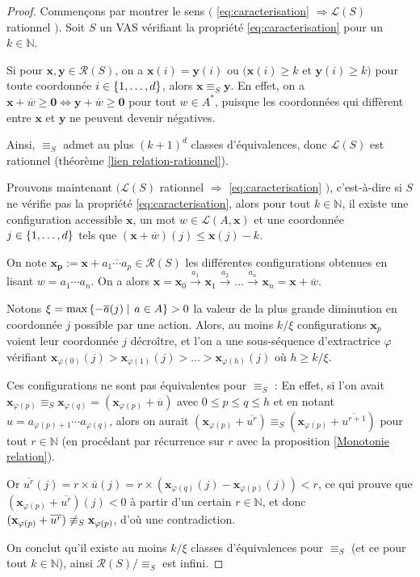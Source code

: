 \documentclass[a4paper,final]{article}
\theoremstyle{definition}
\let\phi\varphi
\let\leq\leqslant
\let\geq\geqslant
\newcommand{\set}[2]{\left\{#1\mathrel{\left|\vphantom{#1}\vphantom{#2}\right.}#2\right\}}
\newcommand{\os}[1]{\left\{\mathinner{#1}\right\}}
\newcommand{\N}{\ensuremath{\mathbb{N}}}
\newcommand{\lang}{\ensuremath{\mathcal{L}}}
\newcommand{\conf}{\ensuremath{\mathcal{R}}}
\newcommand{\trans}[2]{\ensuremath{\stackrel{#1}{\longrightarrow}_{#2}}}
\newcommand{\vect}[1]{\ensuremath{\mathbf{#1}}}
\newcommand{\rel}{\ensuremath{\equiv}}
\newcommand{\equivaut}{\ensuremath{\Leftrightarrow}}
\newcommand{\valeur}[1]{\ensuremath{\overline{#1}}}
\begin{document}
\begin{proof}
Commençons par montrer le sens $\big($ \eqref{eq:caracterisation} $\Rightarrow \lang(S)$ rationnel $\big)$.
Soit $S$ un VAS vérifiant la propriété \eqref{eq:caracterisation} pour un $k\in\N$.

Si pour $\vect{x},\vect{y}\in\conf(S)$, on a 
$\vect{x}(i)=\vect{y}(i)$ ou $\big( \vect{x}(i)\geq k \text{ et } \vect{y}(i)\geq k \big)$
pour toute coordonnée $i\in\os{1,\dots,d}$, alors $\vect{x}\rel_S \vect{y}$. 
En effet, on a $\vect{x} +\valeur{w} \geq\vect{0} \equivaut \vect{y} +\valeur{w} \geq\vect{0}$ pour tout $w\in A^\ast$, 
puisque les coordonnées qui diffèrent entre $\vect{x}$ et $\vect{y}$ ne peuvent devenir négatives.

Ainsi, $\rel_S$ admet au plus $(k+1)^d$ classes d'équivalences, donc $\lang(S)$ est rationnel (théorème \ref{lien relation-rationnel}).

\vspace{4mm}\noindent
Prouvons maintenant $\big(\lang(S)$ rationnel $\Rightarrow$ \eqref{eq:caracterisation} $\big)$, c'est-à-dire si $S$ ne vérifie pas la propriété \eqref{eq:caracterisation}, alors
pour tout $k\in\N$, il existe une configuration accessible $\vect{x}$, un mot $w\in \lang(A,\vect{x})$ et une coordonnée $j\in\os{1,\dots,d}$ tels que $(\vect{x} +\valeur{w})(j)\leq \vect{x}(j)-k$.

On note $\vect{x_p}:=\vect{x} +\valeur{a_1\cdots a_p} \in\conf(S)$ les différentes configurations obtenues en lisant $w=a_1\cdots a_n$.
On a alors $\vect{x}=\vect{x}_0 \trans{a_1}{}\vect{x}_1 \trans{a_2}{}\dots \trans{a_n}{}\vect{x}_n= \vect{x} +\valeur{w}$.

Notons $\xi = \text{max}\set{-\valeur{a}(j)} {a\in A} >0$ la valeur de la plus grande diminution en coordonnée $j$ possible par une action.
Alors, au moins $k/\xi$ configurations $\vect{x}_p$ voient leur coordonnée $j$ décroître,
et l'on a une sous-séquence d'extractrice $\phi$ vérifiant $\vect{x}_{\phi(0)}(j)>\vect{x}_{\phi(1)}(j)>\dots>\vect{x}_{\phi(h)}(j)$ où $h\geq k/\xi$.


Ces configurations ne sont pas équivalentes pour $\rel_S$ :
En effet, si l'on avait $\vect{x}_{\phi(p)}\rel_S \vect{x}_{\phi(q)} = (\vect{x}_{\phi(p)} +\valeur{u})$ avec $0\leq p\leq q\leq h$ et en notant $u=a_{\phi(p)+1}\cdots a_{\phi(q)}$, 
alors on aurait $(\vect{x}_{\phi(p)} +\valeur{u^r}) \rel_S (\vect{x}_{\phi(p)} +\valeur{u^{r+1}})$ pour tout $r\in\N$ (en procédant par récurrence sur $r$ avec la proposition \ref{Monotonie relation}).

Or $\valeur{u^r}(j) = r\times\valeur{u}(j) = r\times (\vect{x}_{\phi(q)}(j) -\vect{x}_{\phi(p)}(j)) <r$, 
ce qui prouve que $(\vect{x}_{\phi(p)} +\valeur{u^r})(j)<0$ à partir d'un certain $r\in\N$, 
et donc $(\vect{x}_{\phi(p)} +\valeur{u^r}) \not\rel_S \vect{x}_{\phi(p)}$, d'où une contradiction.

On conclut qu'il existe au moins $k/\xi$ classes d'équivalences pour $\rel_S$ (et ce pour tout $k\in\N$), 
ainsi $\conf(S)/\rel_S$ est infini.
\end{proof}
\end{document}

